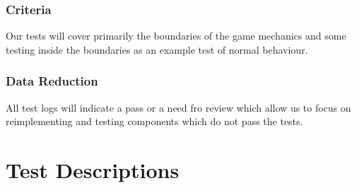 \documentclass[11pt, oneside]{article}   	%
\begin{document}
\subsubsection*{Criteria}
Our tests will cover primarily the boundaries of the game mechanics and some testing inside the boundaries as an example test of normal behaviour.

\subsubsection*{Data Reduction}
All test logs will indicate a pass or a need fro review which allow us to focus on reimplementing and testing components which do not pass the tests.

\newpage
\section{Test Descriptions}
\end{document}
